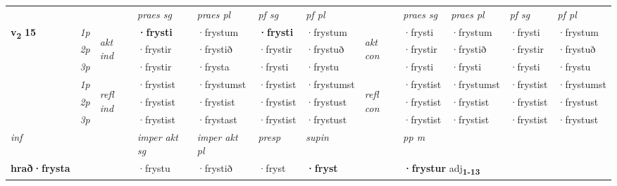 \begin{longtable}[l]{X>{\footnotesize\itshape}llXXXXlXXXX}
 & &   & \textit{praes sg}  & \textit{praes pl}    & \textit{ pf sg} & \textit{pf pl} & & \textit{praes sg}  & \textit{praes pl}    & \textit{pf sg} & \textit{pf pl }  \\ \cmidrule{4-7} \cmidrule{9-12}
 \multirow{2}{*}{{{\textbf{v{\textsubscript{2}}} \Large{\textbf{15}}}}}  & 1p & \multirow{3}{*}{\begin{turn}{90}\textit{akt ind}\end{turn}} & \textbf{·frysti} & ·frystum & \textbf{·frysti} & ·frystum & \multirow{3}{*}{\begin{turn}{90}\textit{akt con}\end{turn}} &·frysti & ·frystum & ·frysti & ·frystum\\*
 & 2p &  &  ·frystir  & ·frystið & ·frystir & ·frystuð & & ·frystir & ·frystið & ·frystir & ·frystuð \\*
 & 3p &  & ·frystir & ·frysta & ·frysti & ·frystu & & ·frysti & ·frysti& ·frysti & ·frystu \\*
\cmidrule{4-7} \cmidrule{9-12}
 & 1p & \multirow{3}{*}{\begin{turn}{90}\textit{refl ind}\end{turn}}  & ·frystist & ·frystumst & ·frystist & ·frystumst & \multirow{3}{*}{\begin{turn}{90}\textit{refl con}\end{turn}}  &·frystist & ·frystumst & ·frystist & ·frystumst \\*
 & 2p &  & ·frystist & ·frystist & ·frystist & ·frystust & &·frystist & ·frystist & ·frystist & ·frystust \\*
 & 3p  & & ·frystist & ·frystast & ·frystist & ·frystust & & ·frystist & ·frystist& ·frystist & ·frystust \\*
\cmidrule{4-7} \cmidrule{9-12}

   {\textit{inf}} & &  & \textit{imper akt sg} & \textit{imper akt pl}   & \textit{presp} & \textit{supin}  && \textit{pp m} \\*
  {\textbf{hrað\allowbreak ·frysta}} & && ·frystu  & ·frystið   & ·fryst &  \textbf{·fryst}  && \multicolumn{2}{l}{\textbf{·frystur} adj\textbf{\textsubscript{1-13}}} \\*

\midrule


\end{longtable}
